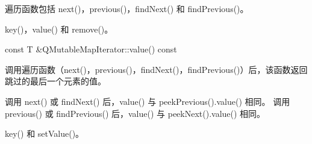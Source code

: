 遍历函数包括 next()，previous()，findNext() 和 findPrevious()。

\begin{seeAlso}
key()，value() 和 remove()。
\end{seeAlso}

const T \&QMutableMapIterator::value() const

调用遍历函数（next()，previous()，findNext()，findPrevious()）后，该函数返回跳过的最后一个元素的值。

调用 next() 或 findNext() 后，value() 与 peekPrevious().value() 相同。
调用 previous() 或 findPrevious() 后，value() 与 peekNext().value() 相同。

\begin{seeAlso}
key() 和 setValue()。
\end{seeAlso}